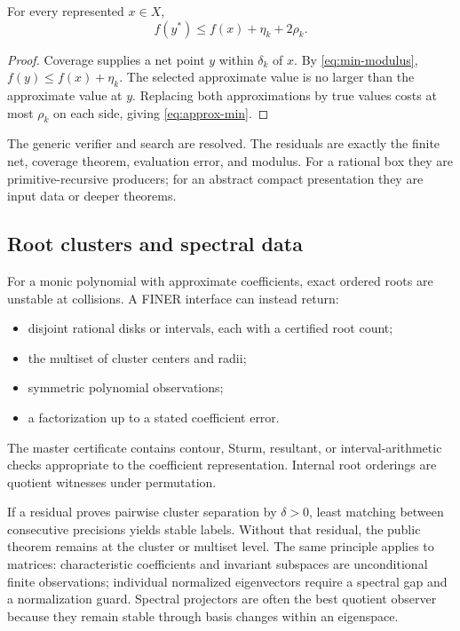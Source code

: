 \begin{theorem}
For every represented \(x\in X\),
\begin{equation}
 f(y^*)\leq f(x)+\eta_k+2\rho_k.
 \label{eq:approx-min}
\end{equation}
\end{theorem}

\begin{proof}
Coverage supplies a net point \(y\) within \(\delta_k\) of \(x\).  By \eqref{eq:min-modulus}, \(f(y)\leq f(x)+\eta_k\).  The selected approximate value is no larger than the approximate value at \(y\).  Replacing both approximations by true values costs at most \(\rho_k\) on each side, giving \eqref{eq:approx-min}.
\end{proof}

The generic verifier and search are resolved.  The residuals are exactly the finite net, coverage theorem, evaluation error, and modulus.  For a rational box they are primitive-recursive producers; for an abstract compact presentation they are input data or deeper theorems.

\subsection{Root clusters and spectral data}

For a monic polynomial with approximate coefficients, exact ordered roots are unstable at collisions.  A FINER interface can instead return:
\begin{itemize}[leftmargin=2em]
\item disjoint rational disks or intervals, each with a certified root count;
\item the multiset of cluster centers and radii;
\item symmetric polynomial observations;
\item a factorization up to a stated coefficient error.
\end{itemize}
The master certificate contains contour, Sturm, resultant, or interval-arithmetic checks appropriate to the coefficient representation.  Internal root orderings are quotient witnesses under permutation.

If a residual proves pairwise cluster separation by \(\delta>0\), least matching between consecutive precisions yields stable labels.  Without that residual, the public theorem remains at the cluster or multiset level.  The same principle applies to matrices: characteristic coefficients and invariant subspaces are unconditional finite observations; individual normalized eigenvectors require a spectral gap and a normalization guard.  Spectral projectors are often the best quotient observer because they remain stable through basis changes within an eigenspace.

